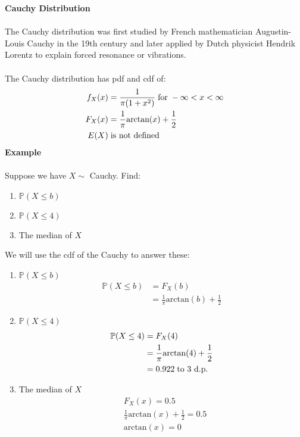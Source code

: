 \documentclass[,oneside]{article}
\begin{document}
\begin{enumerate}
\textbf{Cauchy Distribution}\\ \\
The Cauchy distribution was first studied by French mathematician Augustin-Louis Cauchy in the 19th century and later applied by Dutch physicist Hendrik Lorentz to explain forced resonance or vibrations.\\ \\
The Cauchy distribution has pdf and cdf of:
\begin{align*}
f_X(x) &= \frac{1}{\pi (1+x^2)} \hspace{0.1cm} \text{for}\hspace{0.1cm} -\infty < x < \infty \\
F_X(x) &= \frac{1}{\pi} \text{arctan}(x)+\frac{1}{2}\\
E(X) &\hspace{0.1cm} \text{is not defined}
\end{align*}
\textbf{Example}\\ \\
Suppose we have $X \sim$ Cauchy. Find:
\begin{enumerate}
\item $\mathbb{P}(X \leq b)$
\item $\mathbb{P}(X \leq 4)$
\item The median of $X$\\
\end{enumerate}
We will use the cdf of the Cauchy to answer these:\\
\begin{enumerate}
\item $\mathbb{P}(X \leq b)$
\begin{align*}
\mathbb{P}(X \leq b)&= F_X(b)\\
&= \frac{1}{\pi}\text{arctan}(b)+\frac{1}{2}
\end{align*}
\item $\mathbb{P}(X \leq 4)$
\begin{align*}
\mathbb{P}(X \leq 4)&= F_X(4)\\
&= \frac{1}{\pi}\text{arctan}(4)+\frac{1}{2}\\
&= 0.922 \hspace{0.1cm}\text{to 3 d.p.}
\end{align*}
\item The median of $X$
\begin{align*}
&F_X(x)=0.5\\
&\frac{1}{\pi}\text{arctan}(x)+\frac{1}{2}= 0.5\\
&\text{arctan}(x)=0
\end{align*}

\end{enumerate}
\end{enumerate}
\end{document}
